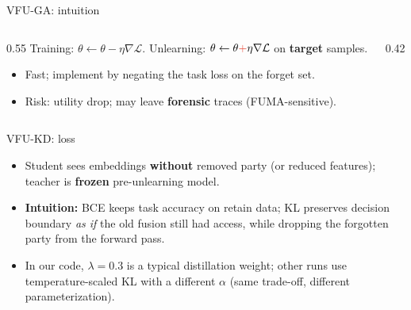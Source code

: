 \documentclass[aspectratio=169, 11pt]{beamer}
\begin{document}
\begin{frame}{VFU-GA: intuition}
  \begin{columns}[T]
    \begin{column}{0.55\textwidth}
      Training: $\theta \leftarrow \theta - \eta \nabla \mathcal{L}$.\quad
      Unlearning: $\theta \leftarrow \theta \textcolor{vflred}{\mathbf{+}} \eta \nabla \mathcal{L}$ on \textbf{target} samples.
      \vspace{0.5em}
      \begin{itemize}
        \item Fast; implement by negating the task loss on the forget set.
        \item Risk: utility drop; may leave \textbf{forensic} traces (FUMA-sensitive).
      \end{itemize}
    \end{column}
    \begin{column}{0.42\textwidth}
      \begin{center}
      \end{center}
    \end{column}
  \end{columns}
\end{frame}

\begin{frame}{VFU-KD: loss}
  \begin{center}
  \end{center}
  \vspace{0.35em}
  \begin{itemize}
    \item Student sees embeddings \textbf{without} removed party (or reduced features); teacher is \textbf{frozen} pre-unlearning model.
    \item \textbf{Intuition:} BCE keeps task accuracy on retain data; KL preserves decision boundary \emph{as if} the old fusion still had access, while dropping the forgotten party from the forward pass.
    \item In our code, $\lambda = 0.3$ is a typical distillation weight; other runs use temperature-scaled KL with a different $\alpha$ (same trade-off, different parameterization).
  \end{itemize}
\end{frame}
\end{document}

